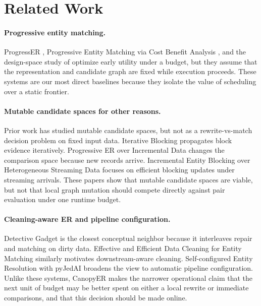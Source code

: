 \documentclass{article}
\newcommand{\method}{CanopyER}
\begin{document}
\section{Related Work}
\label{sec:related}

\paragraph{Progressive entity matching.}
ProgressER \citep{altowim2018progresser}, Progressive Entity Matching via Cost Benefit Analysis \citep{sun2022costbenefit}, and the design-space study of \citet{maciejewski2025progressive} optimize early utility under a budget, but they assume that the representation and candidate graph are fixed while execution proceeds. These systems are our most direct baselines because they isolate the value of scheduling over a static frontier.

\paragraph{Mutable candidate spaces for other reasons.}
Prior work has studied mutable candidate spaces, but not as a rewrite-vs-match decision problem on fixed input data. Iterative Blocking \citep{whang2009iterative} propagates block evidence iteratively. Progressive ER over Incremental Data \citep{gazzarri2023incremental} changes the comparison space because new records arrive. Incremental Entity Blocking over Heterogeneous Streaming Data \citep{araujo2022incremental} focuses on efficient blocking updates under streaming arrivals. These papers show that mutable candidate spaces are viable, but not that local graph mutation should compete directly against pair evaluation under one runtime budget.

\paragraph{Cleaning-aware ER and pipeline configuration.}
Detective Gadget \citep{buoncristiano2024detective} is the closest conceptual neighbor because it interleaves repair and matching on dirty data. Effective and Efficient Data Cleaning for Entity Matching \citep{ao2019effective} similarly motivates downstream-aware cleaning. Self-configured Entity Resolution with pyJedAI \citep{efthymiou2023pyjedai} broadens the view to automatic pipeline configuration. Unlike these systems, \method{} makes the narrower operational claim that the next unit of budget may be better spent on either a local rewrite or immediate comparisons, and that this decision should be made online.
\end{document}
